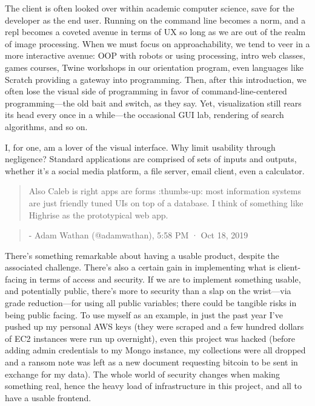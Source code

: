 \documentclass[11pt, twoside, reqno]{book}
\begin{document}
The client is often looked over within academic computer science, save for the developer as the end user. Running on the command line becomes a norm, and a repl becomes a coveted avenue in terms of UX so long as we are out of the realm of image processing. When we must focus on approachability, we tend to veer in a more interactive avenue: OOP with robots or using processing, intro web classes, games courses, Twine workshops in our orientation program, even languages like Scratch providing a gateway into programming. Then, after this introduction, we often lose the visual side of programming in favor of command-line-centered programming—the old bait and switch, as they say. Yet, visualization still rears its head every once in a while—the occasional GUI lab, rendering of search algorithms, and so on.

I, for one, am a lover of the visual interface. Why limit usability through negligence? Standard applications are comprised of sets of inputs and outputs, whether it's a social media platform, a file server, email client, even a calculator.

\begin{quote}
Also Caleb is right apps are forms :thumbs-up: most information systems are just friendly tuned UIs on top of a database. I think of something like Highrise as the prototypical web app.
\end{quote}

\begin{quote}
- Adam Wathan (@adamwathan), 5:58 PM · Oct 18, 2019
\end{quote}


There's something remarkable about having a usable product, despite the associated challenge. There's also a certain gain in implementing what is client-facing in terms of access and security. If we are to implement something usable, and potentially public, there's more to security than a slap on the wrist—via grade reduction—for using all public variables; there could be tangible risks in being public facing. To use myself as an example, in just the past year I've pushed up my personal AWS keys (they were scraped and a few hundred dollars of EC2 instances were run up overnight), even this project was hacked (before adding admin credentials to my Mongo instance, my collections were all dropped and a ransom note was left as a new document requesting bitcoin to be sent in exchange for my data). The whole world of security changes when making something real, hence the heavy load of infrastructure in this project, and all to have a usable frontend.
\end{document}
